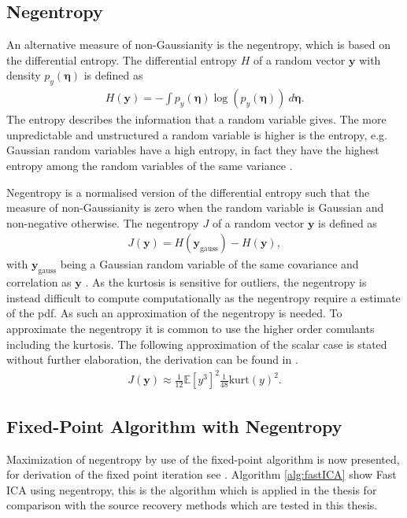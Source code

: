 \subsection{Negentropy}
An alternative measure of non-Gaussianity is the negentropy, which is based on the differential entropy. The differential entropy $H$ of a random vector $\mathbf{y}$ with density $p_y (\boldsymbol{\eta})$ is defined as
\begin{align*}
H(\mathbf{y}) = - \int p_y (\boldsymbol{\eta}) \log (p_y (\boldsymbol{\eta})) \ d\boldsymbol{\eta}.
\end{align*}
The entropy describes the information that a random variable gives. The more unpredictable and unstructured a random variable is higher is the entropy, e.g. Gaussian random variables have a high entropy, in fact they have the highest entropy among the random variables of the same variance \cite[p. 182]{ICA}.

Negentropy is a normalised version of the differential entropy such that the measure of non-Gaussianity is zero when the random variable is Gaussian and non-negative otherwise. The negentropy $J$ of a random vector $\mathbf{y}$ is defined as 
\begin{align*}
J(\mathbf{y}) = H(\mathbf{y}_{\text{gauss}}) - H(\mathbf{y}),
\end{align*}
with $\mathbf{y}_{\text{gauss}}$ being a Gaussian random variable of the same covariance and correlation as $\mathbf{y}$ \cite[p. 182]{ICA}.
As the kurtosis is sensitive for outliers, the negentropy is instead difficult to compute computationally as the negentropy require a estimate of the pdf. As such an approximation of the negentropy is needed.
To approximate the negentropy it is common to use the higher order comulants including the kurtosis. The following approximation of the scalar case is stated without further elaboration, the derivation can be found in \cite[p. 183]{ICA}. 
\begin{align*}
J(\mathbf{y}) \approx \frac{1}{12} \mathbb{E}[y^{3}]^2 \frac{1}{48}\text{kurt}(y)^2.
\end{align*}


\subsection{Fixed-Point Algorithm with Negentropy}
Maximization of negentropy by use of the fixed-point algorithm is now presented, for derivation of the fixed point iteration see \cite[p. 188]{ICA}. Algorithm \ref{alg:fastICA} show Fast ICA using negentropy, this is the algorithm which is applied in the thesis for comparison with the source recovery methods which are tested in this thesis.    

